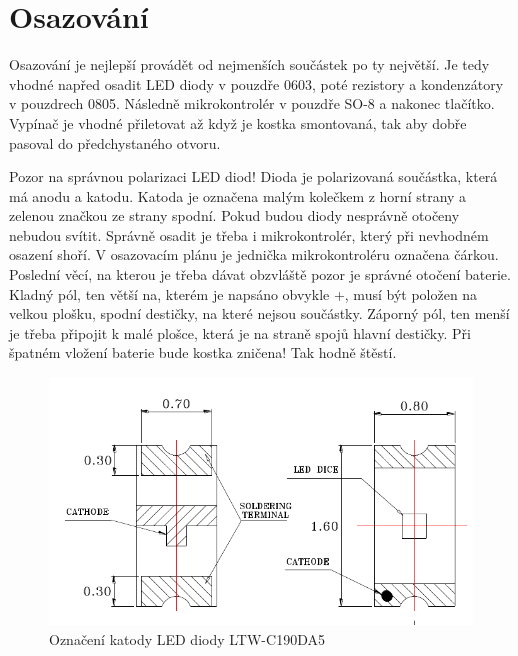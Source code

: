 \section*{Osazování}

Osazování je nejlepší provádět od nejmenších součástek po ty největší. Je tedy vhodné napřed osadit LED diody v pouzdře 0603, poté rezistory a kondenzátory v pouzdrech 0805. Následně mikrokontrolér v pouzdře SO-8 a nakonec tlačítko. Vypínač je vhodné přiletovat až když je kostka smontovaná, tak aby dobře pasoval do předchystaného otvoru.

Pozor na správnou polarizaci LED diod! Dioda je polarizovaná součástka, která má anodu a katodu. Katoda je označena malým kolečkem z horní strany a zelenou značkou ze strany spodní. Pokud budou diody nesprávně otočeny nebudou svítit. Správně osadit je třeba i mikrokontrolér, který při nevhodném osazení shoří. V osazovacím plánu je jednička mikrokontroléru označena čárkou. Poslední věcí, na kterou je třeba dávat obzvláště pozor je správné otočení baterie. Kladný pól, ten větší na, kterém je napsáno obvykle +, musí být položen na velkou plošku, spodní destičky, na které nejsou součástky. Záporný pól, ten menší je třeba připojit k malé plošce, která je na straně spojů hlavní destičky. Při špatném vložení baterie bude kostka zničena! Tak hodně štěstí.

\begin{figure}[H]
  \centering
  \includegraphics[width=\textwidth]{../img/LED.pdf}
  \caption{Označení katody LED diody LTW-C190DA5}
  \label{img:1}
\end{figure}